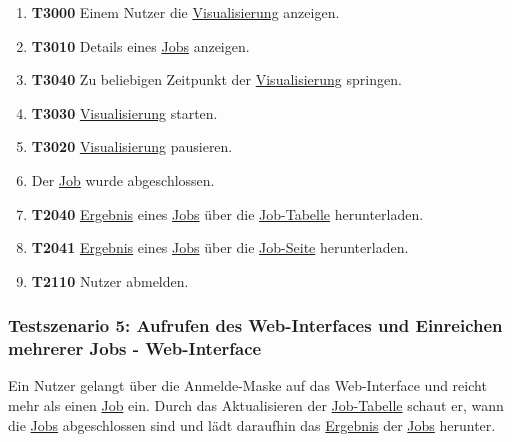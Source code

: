 \begin{enumerate}
    \item \textbf{T3000} Einem \gls{Nutzer} die \hyperref[pages:visualization]{Visualisierung} anzeigen. 
    
    \item \textbf{T3010} Details eines  \hyperref[B:Jobs]{Jobs} anzeigen.
    
    \item \textbf{T3040} Zu beliebigen Zeitpunkt der \hyperref[pages:visualization]{Visualisierung} springen.
    
    \item \textbf{T3030} \hyperref[pages:visualization]{Visualisierung} starten. 
    
    \item \textbf{T3020} \hyperref[pages:visualization]{Visualisierung} pausieren.
    
    \item Der \hyperref[B:Jobs]{Job} wurde abgeschlossen.
    
    \item \textbf{T2040} \hyperref[B:Job-Ergebnis]{Ergebnis} eines \hyperref[B:Jobs]{Jobs} über die \hyperref[pages:job-table]{Job-Tabelle} herunterladen.
        
    \item \textbf{T2041} \hyperref[B:Job-Ergebnis]{Ergebnis} eines \hyperref[B:Jobs]{Jobs} über die \hyperref[pages:job-page]{Job-Seite} herunterladen. 
    
    \item \textbf{T2110} \gls{Nutzer} abmelden.

\end{enumerate}

\subsubsection{Testszenario 5: Aufrufen des Web-Interfaces und Einreichen mehrerer Jobs - Web-Interface}
Ein \gls{Nutzer} gelangt über die Anmelde-Maske auf das \gls{Web-Interface} und reicht mehr als einen \hyperref[B:Jobs]{Job} ein. Durch das Aktualisieren der \hyperref[pages:job-table]{Job-Tabelle} schaut er, wann die  \hyperref[B:Jobs]{Jobs} abgeschlossen sind und lädt daraufhin das \hyperref[B:Job-Ergebnis]{Ergebnis} der  \hyperref[B:Jobs]{Jobs} herunter.

